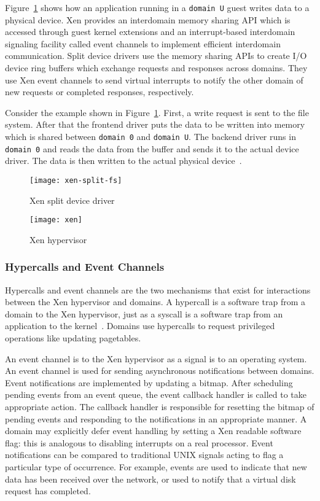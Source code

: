 Figure~\ref{xen-split2} shows how an application running in a
\texttt{domain U} guest writes data to a physical device. Xen
provides an interdomain memory sharing API which is accessed through 
guest kernel extensions and an interrupt-based interdomain signaling
facility called event channels to implement efficient interdomain
communication. Split device drivers use the memory sharing APIs to
create I/O device ring buffers which exchange requests and responses
across domains. They use Xen event channels to send virtual interrupts 
to notify the other domain of new requests or completed responses, 
respectively.

Consider the example shown in Figure~\ref{xen-split2}. First, a write
request is sent to the file system. After that the frontend driver
puts the data to be written into memory which is shared between \texttt{domain 0} and
\texttt{domain U}. The backend driver runs in \texttt{domain 0} and reads the data from the
buffer and sends it to the actual device driver. The data is then written
to the actual physical device~\cite{Chisnall:2007:DGX:1407351}.

\begin{figure}[!h]
\centering
\texttt{[image: xen-split-fs]}
\caption{Xen split device driver}
\label{xen-split2}
\end{figure}
\begin{figure}[!h]
\centering
\texttt{[image: xen]}
\caption{Xen hypervisor}
\label{xen}
\end{figure}

\subsubsection*{Hypercalls and Event Channels}
Hypercalls and event channels are the two mechanisms that exist for
interactions between the Xen hypervisor and domains. A hypercall is a
software trap from a domain to the Xen hypervisor, just as a syscall is a
software trap from an application to the kernel~\cite{hypercall}. Domains
use hypercalls to request privileged operations like updating pagetables.

An event channel is to the Xen hypervisor as a signal is to an operating
system. An event channel is used for sending asynchronous notifications
between domains. Event notifications are implemented by updating a
bitmap. After scheduling pending events from an event queue, the event
callback handler is called to take appropriate action. The callback
handler is responsible for resetting the bitmap of pending events and
responding to the notifications in an appropriate manner. A domain may
explicitly defer event handling by setting a Xen readable software flag:
this is analogous to disabling interrupts on a real processor. Event
notifications can be compared to traditional UNIX signals acting to
flag a particular type of occurrence. For example, events are used to
indicate that new data has been received over the network, or used to
notify that a virtual disk request has completed.

